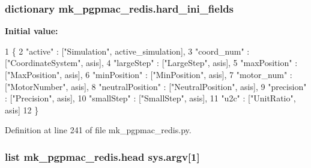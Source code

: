 \hypertarget{namespacemk__pgpmac__redis_a8257226983aee079ec66f5cc67e194ec}{
\subsubsection[{hard\-\_\-ini\-\_\-fields}]{\setlength{\rightskip}{0pt plus 5cm}dictionary mk\-\_\-pgpmac\-\_\-redis.\-hard\-\_\-ini\-\_\-fields}}\label{namespacemk__pgpmac__redis_a8257226983aee079ec66f5cc67e194ec}
{\bfseries Initial value\-:}
\begin{DoxyCode}
1 \{
2     \textcolor{stringliteral}{"active"}          : [\textcolor{stringliteral}{"Simulation"}, active\_simulation],
3     \textcolor{stringliteral}{"coord\_num"}       : [\textcolor{stringliteral}{"CoordinateSystem"}, asis],
4     \textcolor{stringliteral}{"largeStep"}       : [\textcolor{stringliteral}{"LargeStep"}, asis],
5     \textcolor{stringliteral}{"maxPosition"}     : [\textcolor{stringliteral}{"MaxPosition"}, asis],
6     \textcolor{stringliteral}{"minPosition"}     : [\textcolor{stringliteral}{"MinPosition"}, asis],
7     \textcolor{stringliteral}{"motor\_num"}       : [\textcolor{stringliteral}{"MotorNumber"}, asis],
8     \textcolor{stringliteral}{"neutralPosition"} : [\textcolor{stringliteral}{"NeutralPosition"}, asis],
9     \textcolor{stringliteral}{"precision"}       : [\textcolor{stringliteral}{"Precision"}, asis],
10     \textcolor{stringliteral}{"smallStep"}       : [\textcolor{stringliteral}{"SmallStep"}, asis],
11     \textcolor{stringliteral}{"u2c"}             : [\textcolor{stringliteral}{"UnitRatio"}, asis]
12     \}
\end{DoxyCode}


Definition at line 241 of file mk\-\_\-pgpmac\-\_\-redis.\-py.

\hypertarget{namespacemk__pgpmac__redis_a760ff4955cbf5beef4ae36a28c30b01a}{
\subsubsection[{head}]{\setlength{\rightskip}{0pt plus 5cm}list mk\-\_\-pgpmac\-\_\-redis.\-head sys.\-argv\mbox{[}1\mbox{]}}}\label{namespacemk__pgpmac__redis_a760ff4955cbf5beef4ae36a28c30b01a}


